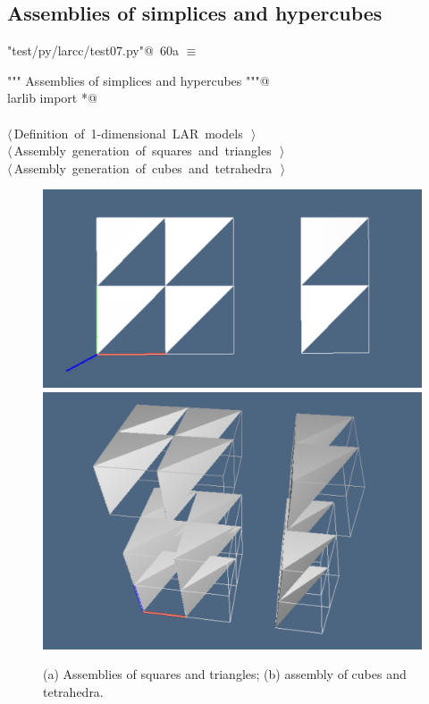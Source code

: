 \documentclass[11pt,oneside]{article}    %
\begin{document}
\subsection{Assemblies of simplices and hypercubes}

\begin{flushleft} \small \label{scrap117}
\protect{}\verb@"test/py/larcc/test07.py"@\nobreak\ {\footnotesize 60a }$\equiv$
\vspace{-1ex}
\begin{list}{}{} \item
\mbox{}\verb@""" Assemblies of simplices and hypercubes """@\\
\mbox{}\verb@from larlib import *@\\
\mbox{}\verb@@\\
\mbox{}\verb@@\hbox{$\langle\,$Definition of 1-dimensional LAR models\nobreak\ {\footnotesize {}}$\,\rangle$}\verb@@\\
\mbox{}\verb@@\hbox{$\langle\,$Assembly generation of squares and triangles\nobreak\ {\footnotesize {}}$\,\rangle$}\verb@@\\
\mbox{}\verb@@\hbox{$\langle\,$Assembly generation of cubes and tetrahedra\nobreak\ {\footnotesize {}}$\,\rangle$}\verb@@\\
\mbox{}\verb@@{\NWsep}
\end{list}
\vspace{-2ex}
\end{flushleft}

\begin{figure}[htbp] %
   \centering
   \includegraphics[width=0.405\linewidth]{images/assembly1} 
   \includegraphics[width=0.315\linewidth]{images/assembly2} 
   \caption{(a) Assemblies of squares and triangles; (b) assembly of cubes and tetrahedra.}
   \label{fig:example}
\end{figure}
\end{document}
